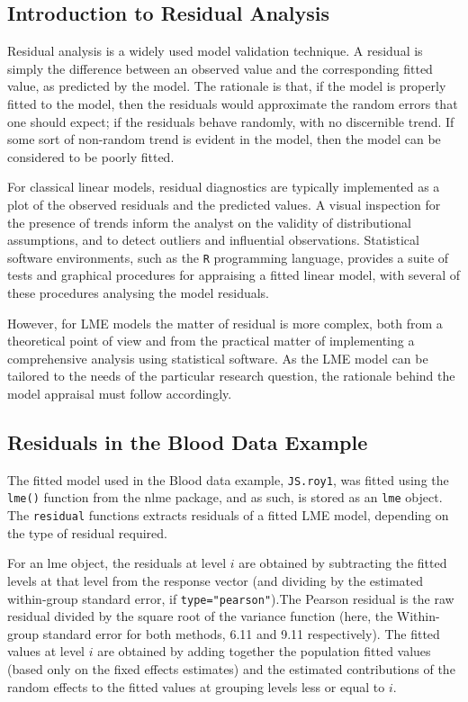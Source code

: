 \documentclass[Main.tex]{subfiles}
\begin{document}
\subsection{Introduction to Residual Analysis}
Residual analysis is a widely used model validation technique. A residual is simply the difference between an observed value and the corresponding fitted value, as predicted by the model. The rationale is that, if the model is properly fitted to the model, then the residuals would approximate the random errors that one should expect; if the residuals behave randomly, with no discernible trend. If some sort of non-random trend is evident in the model, then the model can be considered to be poorly fitted.

For classical linear models, residual diagnostics are typically implemented as a plot of the observed residuals and the predicted values. A visual inspection for the presence of trends inform the analyst on the validity of distributional assumptions, and to detect outliers and influential observations. Statistical software environments, such as the \texttt{R} programming language, provides a suite of tests and graphical procedures for appraising a fitted linear model, with several 
of these procedures analysing the model residuals.

However, for LME models the matter of residual is more complex, both from a theoretical point of view and from the practical matter of implementing a comprehensive analysis using statistical software. As the LME model can be tailored to the needs of the particular research question, the rationale behind the model appraisal must follow accordingly.


\subsection{Residuals in the Blood Data Example}
The fitted model used in the Blood data example, \texttt{JS.roy1}, was fitted using the \texttt{lme()} function from the nlme package, and as such, is stored as an \texttt{lme} object. The \texttt{residual} functions extracts residuals of a fitted LME model, depending on the type of residual required.

For an lme object, the residuals at level $i$ are obtained by subtracting the fitted levels at that level from the response vector (and dividing by the estimated within-group standard error, if \texttt{type="pearson"}).The Pearson residual is the raw residual divided by the square root of the variance function (here, the Within-group standard error for both methods, 6.11 and 9.11 respectively). The fitted values at level $i$ are obtained by adding together the population fitted values (based only on the fixed effects estimates) and the estimated contributions of the random effects to the fitted values at grouping levels less or equal to $i$.
\end{document}
